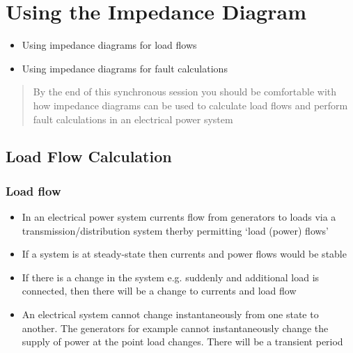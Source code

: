 \documentclass[class=report, crop=false, 12pt,a4paper]{standalone}
\begin{document}
\chapter{Using the Impedance Diagram}
\begin{itemize}
	\item Using impedance diagrams for load flows
	\item Using impedance diagrams for fault calculations
\end{itemize}
\begin{quote}
	By the end of this synchronous session you should be comfortable with how impedance diagrams can be used to calculate load flows and perform fault calculations in an electrical power system
\end{quote}
\section{Load Flow Calculation}
\subsection{Load flow}
\begin{itemize}
	\item In an electrical power system currents flow from generators to loads via a transmission/distribution system therby permitting `load (power) flows'
	\item If a system is at steady-state then currents and power flows would be stable
	\item If there is a change in the system e.g. suddenly and additional load is connected, then there will be a change to currents and load flow
	\item An electrical system cannot change instantaneously from one state to another. The generators for example cannot instantaneously change the supply of power at the point load changes. There will be a transient period
\end{itemize}
\end{document}
